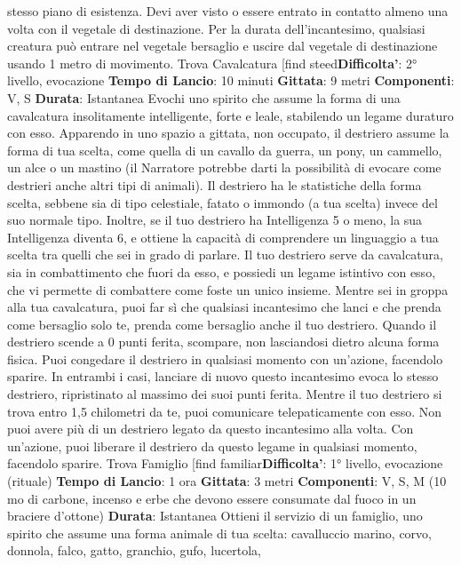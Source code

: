 \begin{multicols}{2}
stesso piano di esistenza. Devi aver visto o essere
entrato in contatto almeno una volta con il vegetale di
destinazione. Per la durata dell’incantesimo, qualsiasi
creatura può entrare nel vegetale bersaglio e uscire dal
vegetale di destinazione usando 1 metro di
movimento.
Trova Cavalcatura
[find steed\textbf{Difficolta'}:
2° livello, evocazione
\textbf{Tempo di Lancio}: 10 minuti
\textbf{Gittata}: 9 metri
\textbf{Componenti}: V, S
\textbf{Durata}: Istantanea
Evochi uno spirito che assume la forma di una
cavalcatura insolitamente intelligente, forte e leale,
stabilendo un legame duraturo con esso. Apparendo in
uno spazio a gittata, non occupato, il destriero assume
la forma di tua scelta, come quella di un cavallo da
guerra, un pony, un cammello, un alce o un mastino (il
Narratore potrebbe darti la possibilità di evocare come
destrieri anche altri tipi di animali). Il destriero ha le
statistiche della forma scelta, sebbene sia di tipo
celestiale, fatato o immondo (a tua scelta) invece del
suo normale tipo. Inoltre, se il tuo destriero ha
Intelligenza 5 o meno, la sua Intelligenza diventa 6, e
ottiene la capacità di comprendere un linguaggio a tua
scelta tra quelli che sei in grado di parlare.
Il tuo destriero serve da cavalcatura, sia in
combattimento che fuori da esso, e possiedi un legame
istintivo con esso, che vi permette di combattere come
foste un unico insieme. Mentre sei in groppa alla tua
cavalcatura, puoi far sì che qualsiasi incantesimo che
lanci e che prenda come bersaglio solo te, prenda
come bersaglio anche il tuo destriero.
Quando il destriero scende a 0 punti ferita, scompare,
non lasciandosi dietro alcuna forma fisica. Puoi
congedare il destriero in qualsiasi momento con
un’azione, facendolo sparire. In entrambi i casi, lanciare
di nuovo questo incantesimo evoca lo stesso destriero,
ripristinato al massimo dei suoi punti ferita.
Mentre il tuo destriero si trova entro 1,5 chilometri da te,
puoi comunicare telepaticamente con esso.
Non puoi avere più di un destriero legato da questo
incantesimo alla volta. Con un’azione, puoi liberare il
destriero da questo legame in qualsiasi momento,
facendolo sparire.
Trova Famiglio
[find familiar\textbf{Difficolta'}:
1° livello, evocazione (rituale)
\textbf{Tempo di Lancio}: 1 ora
\textbf{Gittata}: 3 metri
\textbf{Componenti}: V, S, M (10 mo di carbone, incenso e
erbe che devono essere consumate dal fuoco in un
braciere d’ottone)
\textbf{Durata}: Istantanea
Ottieni il servizio di un famiglio, uno spirito che assume
una forma animale di tua scelta: cavalluccio marino,
corvo, donnola, falco, gatto, granchio, gufo, lucertola,

\end{multicols}
